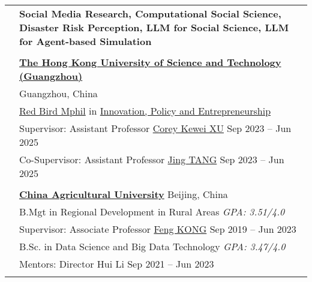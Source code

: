 \documentclass[letterpaper, 11pt]{article}
\begin{document}
\begin{longtable}{p{1.3in}p{4.8in}}



\nohyphens{\color{RoyalBlue}{Research Interests}}
& \bf{Social Media Research, Computational Social Science, Disaster Risk Perception, LLM for Social Science, LLM for Agent-based Simulation}\\
& \\



\color{RoyalBlue}{Education} 
& \textbf{\href{https://www.hkust-gz.edu.cn/}{The Hong Kong University of Science and Technology (Guangzhou)}} \\
& \hfill Guangzhou, China \\
& \href{https://www.hkust-gz.edu.cn/academics/teaching-and-learning-innovation/red-bird-mphil-program/}{Red Bird Mphil} in \href{https://www.hkust-gz.edu.cn/academics/hubs-and-thrust-areas/society-hub/innovation-policy-and-entrepreneurship/}{Innovation, Policy and Entrepreneurship} \\
& Supervisor: Assistant Professor \href{https://facultyprofiles.hkust-gz.edu.cn/faculty-personal-page/XU-Kewei/coreyxu}{Corey Kewei XU}  \hfill Sep 2023 -- Jun 2025\\
& Co-Supervisor: Assistant Professor \href{https://facultyprofiles.hkust-gz.edu.cn/faculty-personal-page/TANG-Jing/jingtang}{Jing TANG}  \hfill Sep 2023 -- Jun 2025\\
& \\

& \textbf{\href{http://en.cau.edu.cn/}{China Agricultural University}} \hfill Beijing, China\\
& B.Mgt in Regional Development in Rural Areas \hfill{\it GPA: 3.51/4.0} \\
& Supervisor: Associate Professor \href{https://cohd.cau.edu.cn/art/2020/11/27/art_48059_998984.html}{Feng KONG}  \hfill Sep 2019 -- Jun 2023\\
& B.Sc. in Data Science and Big Data Technology  \hfill{\it GPA: 3.47/4.0} \\
& Mentors: Director Hui Li \hfill Sep 2021 -- Jun 2023 \\
& \\



\end{longtable}
\end{document}
